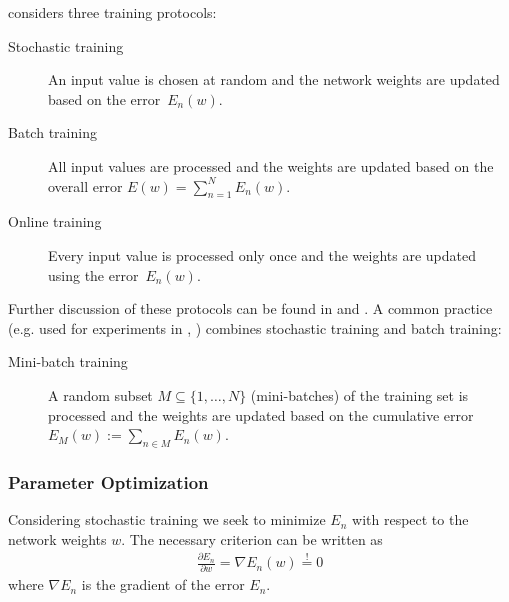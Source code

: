 \cite{DudaHartStork:2001} considers three training protocols:
\begin{description}
	\item[Stochastic training] An input value is chosen at random and the network weights are updated based on the error~$E_n(w)$.
	\item[Batch training] All input values are processed and the weights are updated based on the overall error $E(w) = \sum_{n=1}^N E_n(w)$.
	\item[Online training] Every input value is processed only once and the weights are updated using the error~$E_n(w)$.
\end{description}
Further discussion of these protocols can be found in \cite{Bishop:2006} and \cite{DudaHartStork:2001}. A common practice (e.g. used for experiments in \cite{GlorotBordesBengio:2011}, \cite{GlorotBengio:2010}) combines stochastic training and batch training:
\begin{description}
	\item[Mini-batch training] A random subset $M \subseteq \{1,\ldots,N\}$ (mini-batches) of the training set is processed and the weights are updated based on the cumulative error $E_M(w) := \sum_{n \in M} E_n(w)$.
\end{description}

\subsubsection{Parameter Optimization}
\label{subsubsec:parameter-optimization}

Considering stochastic training we seek to minimize $E_n$ with respect to the network weights $w$. %
The necessary criterion can be written as
\begin{align}
	\frac{\partial E_n}{\partial w} = \nabla E_n(w) \overset{!}{=} 0
\end{align}
where $\nabla E_n$ is the gradient of the error $E_n$.


